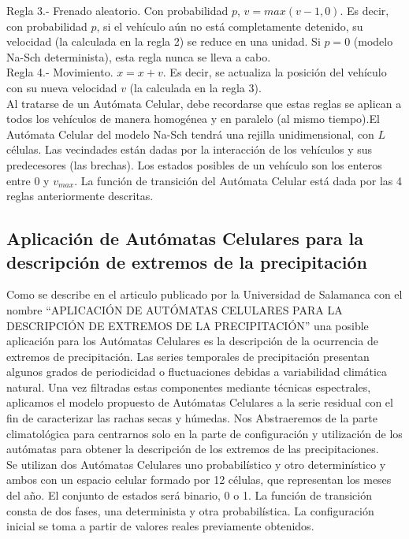Regla 3.- Frenado aleatorio. Con probabilidad $p$, $ v=max(v-1,0)$. Es decir, con probabilidad $p$, si el vehículo aún no está completamente detenido, su velocidad (la calculada en la regla 2) se reduce en una unidad. Si $p=0$ (modelo Na-Sch determinista), esta regla nunca se lleva a cabo.\\

Regla 4.- Movimiento. $ x=x+v$. Es decir, se actualiza la posición del vehículo con su nueva velocidad $v$ (la calculada en la regla 3).\\
 
Al tratarse de un Autómata Celular, debe recordarse que estas reglas se aplican a todos los vehículos de manera homogénea y en paralelo (al mismo tiempo).El Autómata Celular del modelo Na-Sch tendrá una rejilla unidimensional, con $L$ células. Las vecindades están dadas por la interacción de los vehículos y sus predecesores (las brechas). Los estados posibles de un vehículo son los enteros entre 0 y $v_{max}$. La función de transición del Autómata Celular está dada por las 4 reglas anteriormente descritas. \cite{trafico}
 
 
\subsection{Aplicación de Autómatas Celulares para la descripción de extremos de la precipitación}
Como se describe en el articulo publicado por la Universidad de Salamanca con el nombre ``APLICACIÓN DE AUTÓMATAS CELULARES PARA LA DESCRIPCIÓN DE EXTREMOS DE LA PRECIPITACIÓN'' una posible aplicación para los Autómatas Celulares es la descripción de la ocurrencia de extremos de precipitación. Las series temporales de precipitación presentan algunos grados de periodicidad o fluctuaciones debidas a variabilidad climática natural. Una vez filtradas estas componentes mediante técnicas espectrales, aplicamos el modelo propuesto de Autómatas Celulares a la serie residual con el fin de caracterizar las rachas secas y húmedas.
Nos Abstraeremos de la parte climatológica para centrarnos solo en la parte de configuración y utilización de los autómatas para obtener la descripción de los extremos de las precipitaciones.\\

Se utilizan dos Autómatas Celulares uno probabilístico y otro
determinístico y ambos con un espacio celular formado por 12 células, que representan los meses del año. El conjunto de estados será binario, 0 o 1. La función de transición consta de dos fases, una determinista y otra probabilística. La configuración inicial se toma a partir de valores reales previamente obtenidos. \\

